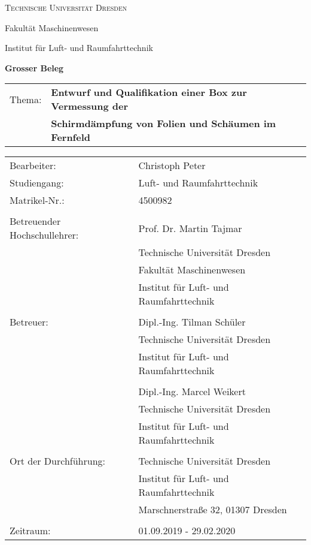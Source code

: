 \begin{titlepage}

\noindent \begin{center}
{\scshape\LARGE Technische Universität Dresden \par}
Fakultät Maschinenwesen \par
Institut für Luft- und Raumfahrttechnik
\par\end{center}

\noindent \vspace{1cm}


\noindent \begin{center}
\textbf{\huge Grosser Beleg} \vspace{2cm}
\par\end{center}{\Large \par}

\begin{tabular}{p{2.5cm} l}
\renewcommand{\arraystretch}{1}
    \Large Thema: & \Large \textbf{Entwurf und Qualifikation einer Box zur Vermessung der} \\
     & \Large \textbf{Schirmdämpfung von Folien und Schäumen im Fernfeld}
\end{tabular}

\vspace{1cm}

\begin{tabular}{p{6cm} l}
\renewcommand{\arraystretch}{1}
Bearbeiter: & Christoph Peter\\
Studiengang: & Luft- und Raumfahrttechnik \\
Matrikel-Nr.: & 4500982 \\
 & \\
Betreuender Hochschullehrer: & Prof. Dr. Martin Tajmar\\
 & Technische Universität Dresden \\
 & Fakultät Maschinenwesen \\
 & Institut für Luft- und Raumfahrttechnik\\
 & \\
 Betreuer: & Dipl.-Ing. Tilman Schüler \\
 & Technische Universität Dresden \\
 & Institut für Luft- und Raumfahrttechnik  \\
 &          \\
 & Dipl.-Ing. Marcel Weikert \\
 & Technische Universität Dresden \\
 & Institut für Luft- und Raumfahrttechnik \\
 & \\
Ort der Durchführung: & Technische Universität Dresden \\
 & Institut für Luft- und Raumfahrttechnik \\
 & Marschnerstraße 32, 01307 Dresden \\
 & \\
 Zeitraum: & 01.09.2019 - 29.02.2020

\end{tabular}

\end{titlepage}
